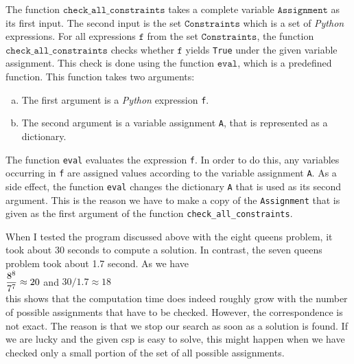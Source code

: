 The function $\texttt{check\_all\_constraints}$ takes a complete variable $\texttt{Assignment}$ as
its first input.  The second input is the set $\texttt{Constraints}$ which is a set of \textsl{Python}
expressions.  For all expressions
$\texttt{f}$ from the set $\texttt{Constraints}$, the function $\texttt{check\_all\_constraints}$ checks
whether $\texttt{f}$ yields \texttt{True} under the given variable assignment.
This check is done using the function $\texttt{eval}$, which is a predefined function.  
This function takes two arguments: 
\begin{enumerate}[(a)]
\item The first argument is a \textsl{Python} expression \texttt{f}.
\item The second argument is a variable assignment \texttt{A}, that is represented as a dictionary.
\end{enumerate}
The function \texttt{eval} evaluates the expression \texttt{f}.  In order to do this, any variables occurring
in \texttt{f} are assigned values according to the variable assignment \texttt{A}.  As a side effect, the function
\texttt{eval} changes the dictionary \texttt{A} that is used as its second argument.  This is the reason we have
to make a copy of the \texttt{Assignment} that is given as the first argument of the function
\texttt{check\_all\_constraints}. 

When I tested the program discussed above with the eight queens problem, it took about 30 seconds to
compute a solution.  In contrast, the seven queens problem took about 1.7 second.  As we have
\\[0.2cm]
\hspace*{1.3cm}
$\displaystyle\frac{8^8}{7^7} \approx 20$ \quad and \quad $30 / 1.7 \approx 18$ 
\\[0.2cm]
this shows that the computation time does indeed roughly grow with the number of possible assignments that
have to be checked.  However, the correspondence is not exact.  The reason is that we stop our
search as soon as a solution is found.  If we are lucky and the given \ac{csp} is easy to solve, this
might happen when we have checked only a small portion of the set of all possible assignments.

